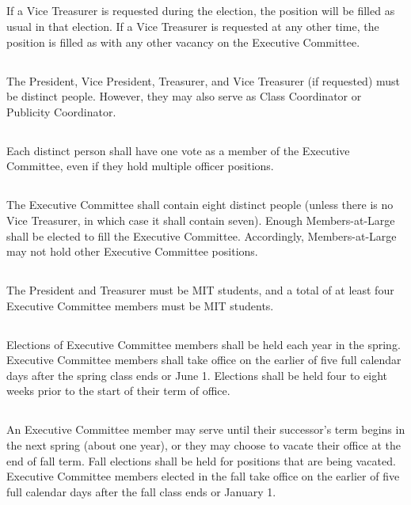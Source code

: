 \documentclass{bylaws}
\begin{document}
\subsection{}If a Vice Treasurer is requested during the election, the position will be filled as usual in that election. If a Vice Treasurer is requested at any other time, the position is filled as with any other vacancy on the Executive Committee.

\subsection{}The President, Vice President, Treasurer, and Vice Treasurer (if requested) must be distinct people. However, they may also serve as Class Coordinator or Publicity Coordinator.
\subsection{}Each distinct person shall have one vote as a member of the Executive Committee, even if they hold multiple officer positions.
\subsection{}The Executive Committee shall contain eight distinct people (unless there is no Vice Treasurer, in which case it shall contain seven). Enough Members-at-Large shall be elected to fill the Executive Committee. Accordingly, Members-at-Large may not hold other Executive Committee positions.
\subsection{}The President and Treasurer must be MIT students, and a total of at least four Executive Committee members must be MIT students.



\subsection{}Elections of Executive Committee members shall be held each year in the spring. Executive Committee members shall take office on the earlier of five full calendar days after the spring class ends or June 1. Elections shall be held four to eight weeks prior to the start of their term of office.
\subsection{}An Executive Committee member may serve until their successor's term begins in the next spring (about one year), or they may choose to vacate their office at the end of fall term. Fall elections shall be held for positions that are being vacated. Executive Committee members elected in the fall take office on the earlier of five full calendar days after the fall class ends or January 1.
\end{document}
